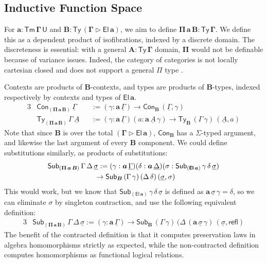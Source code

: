 \documentclass{article}
\theoremstyle{definition}
\theoremstyle{theorem}
\newcommand{\refl}{\mathsf{refl}}
\newcommand{\Con}{\mathsf{Con}}
\newcommand{\Sub}{\mathsf{Sub}}
\newcommand{\Tm}{\mathsf{Tm}}
\newcommand{\Ty}{\mathsf{Ty}}
\newcommand{\U}{\mathsf{U}}
\newcommand{\El}{\mathsf{El}}
\newcommand{\ra}{\rightarrow}
\newcommand{\ext}{\triangleright}
\newcommand{\bTy}{\boldsymbol{\Ty}}
\newcommand{\bGamma}{\boldsymbol{\Gamma}}
\newcommand{\bA}{\boldsymbol{A}}
\newcommand{\ba}{\boldsymbol{a}}
\newcommand{\bB}{\boldsymbol{B}}
\newcommand{\bEl}{\boldsymbol{\El}}
\newcommand{\bPii}{\boldsymbol{\Pi}}
\newcommand{\ul}[1]{\underline{#1}}
\newcommand{\ulGamma}{\ul{\Gamma}}
\newcommand{\ulDelta}{\ul{\Delta}}
\newcommand{\ulsigma}{\ul{\sigma}}
\newcommand{\ulA}{\ul{A}}
\begin{document}
\subsection{Inductive Function Space}

For $\boldsymbol{a : \Tm\,\Gamma\,\U}$ and $\boldsymbol{B :
  \Ty\,(\Gamma\ext\El\,a)}$, we aim to define $\boldsymbol{\Pi\,a\,B}
\boldsymbol{:} \bTy\,\bGamma$. We define this as a dependent product of
isofibrations, indexed by a discrete domain. The discreteness is essential: with
a general $\bA \boldsymbol{:} \bTy\,\bGamma$ domain, $\bPii$ would not be
definable because of variance issues. Indeed, the category of categories is not
locally cartesian closed and does not support a general $\Pi$ type
\cite[Section A1.5]{johnstone2002sketches}.

Contexts are products of $\bB$-contexts, and types are products of $\bB$-types,
indexed respectively by contexts and types of $\bEl\,\ba$.
\begin{alignat*}{3}
  & \Con_{(\bPii\,\ba\,\bB)}\,\ulGamma &&:= (\gamma : \ba\,\ulGamma)\ra \Con_{\bB}\,(\ulGamma, \gamma)\\
  & \Ty_{(\bPii\,\ba\,\bB)}\,\Gamma\,\ulA &&:= (\gamma : \ba\,\ulGamma)(a : \ba\,\ulA\,\gamma)\ra \Ty_{\bB}\,(\Gamma\,\gamma)\,(\ulA, a)
\end{alignat*}
Note that since $\bB$ is over the total $\boldsymbol{(\Gamma\ext\El\,a)}$,
$\Con_{\bB}$ has a $\Sigma$-typed argument, and likewise the last argument
of every $\bB$ component.  We could define substitutions similarly, as
products of substitutions:
\begin{alignat*}{3}
  & \Sub_{(\bPii\,\ba\,\bB)}\,\Gamma\,\Delta\,\ulsigma :=
  (\gamma : \ba\,\ulGamma)(\delta : \ba\,\ulDelta)
  (\sigma : \Sub_{(\bEl\,\ba)}\,\gamma\,\delta\,\ulsigma)\\
  &\hspace{6.5em}\ra \Sub_{\bB}\,(\Gamma\,\gamma)\,(\Delta\,\delta)\,(\ulsigma, \sigma)
\end{alignat*}
This would work, but we know that $\Sub_{(\bEl\,\ba)}\,\gamma\,\delta\,\ulsigma$ is defined
as $\ba\,\ulsigma\,\gamma = \delta$, so we can eliminate $\sigma$ by singleton contraction,
and use the following equivalent definition:
\begin{alignat*}{3}
  & \Sub_{(\bPii\,\ba\,\bB)}\,\Gamma\,\Delta\,\ulsigma :=
  (\gamma : \ba\,\ulGamma)\ra\Sub_{\bB}\,(\Gamma\,\gamma)\,(\Delta\,(\ba\,\ulsigma\,\gamma)\,(\ulsigma, \refl)
\end{alignat*}
The benefit of the contracted definition is that it computes preservation laws
in algebra homomorphisms strictly as expected, while the non-contracted
definition computes homomorphisms as functional logical relations.
\end{document}
